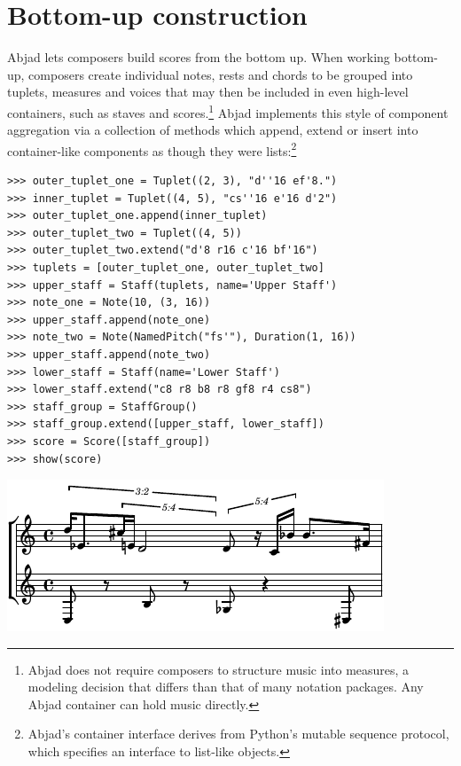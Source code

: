 \documentclass{article}
\begin{document}
\section{Bottom-up construction} \label{sec:bottom-up}

Abjad lets composers build scores from the bottom up. When working bottom-up,
composers create individual notes, rests and chords to be grouped
into tuplets, measures and voices that may then be
included in even high-level containers, such as staves and scores.\footnote{Abjad does not require composers to structure music into measures, a modeling decision that differs than that of many notation packages. Any Abjad container can hold music directly.} Abjad implements this style of
component aggregation via a collection of methods which append, extend or
insert into container-like components as though they were
lists:\footnote{Abjad's container interface derives from Python's mutable
sequence protocol, which specifies an interface to list-like objects.}

\begin{lstlisting}
>>> outer_tuplet_one = Tuplet((2, 3), "d''16 ef'8.")
>>> inner_tuplet = Tuplet((4, 5), "cs''16 e'16 d'2")
>>> outer_tuplet_one.append(inner_tuplet)
>>> outer_tuplet_two = Tuplet((4, 5))
>>> outer_tuplet_two.extend("d'8 r16 c'16 bf'16")
>>> tuplets = [outer_tuplet_one, outer_tuplet_two]
>>> upper_staff = Staff(tuplets, name='Upper Staff')
>>> note_one = Note(10, (3, 16))
>>> upper_staff.append(note_one)
>>> note_two = Note(NamedPitch("fs'"), Duration(1, 16))
>>> upper_staff.append(note_two)
>>> lower_staff = Staff(name='Lower Staff')
>>> lower_staff.extend("c8 r8 b8 r8 gf8 r4 cs8")
>>> staff_group = StaffGroup()
>>> staff_group.extend([upper_staff, lower_staff])
>>> score = Score([staff_group])
>>> show(score)
\end{lstlisting}
\includegraphics{assets/lilypond-1c885bfebd0d1fe0357ba25ba72d36ba.pdf}
\end{document}
